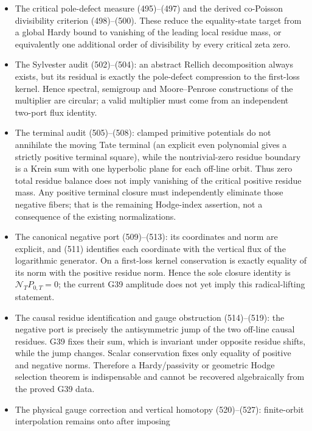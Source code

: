 \documentclass[11pt]{article}
\begin{document}
\begin{itemize}
\item The critical pole-defect measure (495)--(497) and the derived
      co-Poisson divisibility criterion (498)--(500).  These reduce the
      equality-state target from a global Hardy bound to vanishing of the
      leading local residue mass, or equivalently one additional order of
      divisibility by every critical zeta zero.
\item The Sylvester audit (502)--(504): an abstract Rellich decomposition
      always exists, but its residual is exactly the pole-defect compression
      to the first-loss kernel.  Hence spectral, semigroup and
      Moore--Penrose constructions of the multiplier are circular; a valid
      multiplier must come from an independent two-port flux identity.
\item The terminal audit (505)--(508): clamped primitive potentials do not
      annihilate the moving Tate terminal (an explicit even polynomial gives
      a strictly positive terminal square), while the nontrivial-zero residue
      boundary is a Krein sum with one hyperbolic plane for each off-line
      orbit.  Thus zero total residue balance does not imply vanishing of the
      critical positive residue mass.  Any positive terminal closure must
      independently eliminate those negative fibers; that is the remaining
      Hodge-index assertion, not a consequence of the existing
      normalizations.
\item The canonical negative port (509)--(513): its coordinates and norm are
      explicit, and (511) identifies each coordinate with the vertical flux
      of the logarithmic generator.  On a first-loss kernel conservation is
      exactly equality of its norm with the positive residue norm.  Hence the
      sole closure identity is \(\mathcal N_TP_{0,T}=0\); the current G39
      amplitude does not yet imply this radical-lifting statement.
\item The causal residue identification and gauge obstruction (514)--(519):
      the negative port is precisely the antisymmetric jump of the two
      off-line causal residues.  G39 fixes their sum, which is invariant
      under opposite residue shifts, while the jump changes.  Scalar
      conservation fixes only equality of positive and negative norms.
      Therefore a Hardy/passivity or geometric Hodge selection theorem is
      indispensable and cannot be recovered algebraically from the proved
      G39 data.
\item The physical gauge correction and vertical homotopy
      (520)--(527): finite-orbit interpolation remains onto after imposing

\end{itemize}
\end{document}
